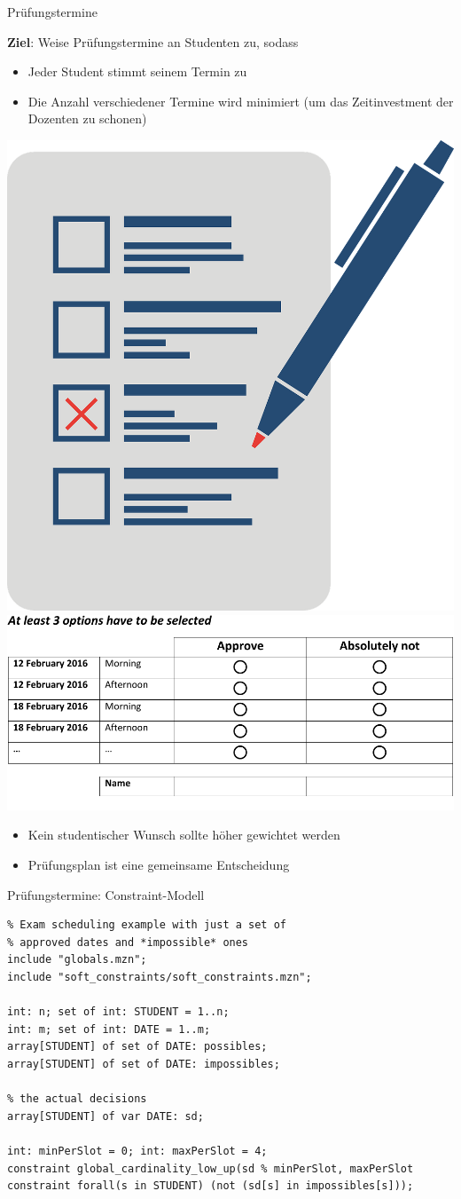 \begin{frame}[fragile]{Prüfungstermine}

\textbf{Ziel}: Weise Prüfungstermine an Studenten zu, sodass
\begin{itemize}
\item Jeder Student stimmt seinem Termin zu 
\item Die Anzahl verschiedener Termine wird minimiert (um das Zeitinvestment der Dozenten zu schonen)
\end{itemize}

\begin{center}
\includegraphics[width=.15\textwidth]{img/voting.png}
\hspace*{4ex}
\includegraphics[width=.5\textwidth]{img/Voting.pdf}
\end{center}

\begin{itemize}
\item Kein studentischer Wunsch sollte höher gewichtet werden
\item Prüfungsplan ist eine gemeinsame Entscheidung

\end{itemize}
\end{frame}

\begin{frame}[fragile]{Prüfungstermine: Constraint-Modell}
\begin{lstlisting}
% Exam scheduling example with just a set of 
% approved dates and *impossible* ones
include "globals.mzn";
include "soft_constraints/soft_constraints.mzn";

int: n; set of int: STUDENT = 1..n; 
int: m; set of int: DATE = 1..m;
array[STUDENT] of set of DATE: possibles;
array[STUDENT] of set of DATE: impossibles;

% the actual decisions
array[STUDENT] of var DATE: sd;

int: minPerSlot = 0; int: maxPerSlot = 4;
constraint global_cardinality_low_up(sd % minPerSlot, maxPerSlot
constraint forall(s in STUDENT) (not (sd[s] in impossibles[s])); 
 
\end{lstlisting}
\end{frame}

